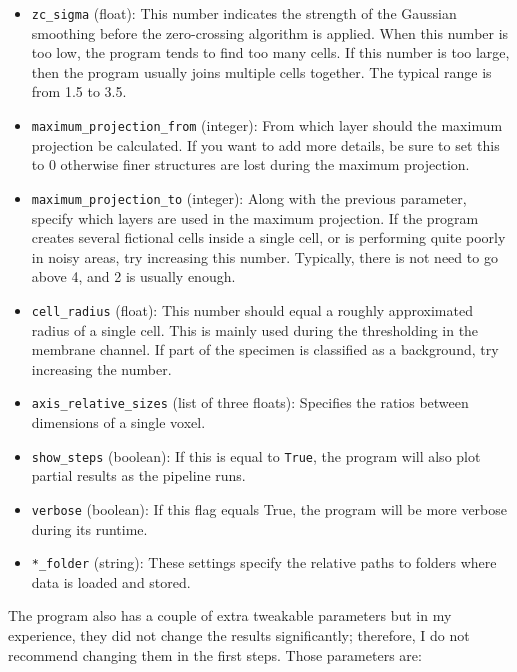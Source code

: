 \documentclass[
  digital,     %
  oneside,     %
  nosansbold,  %
  nocolorbold, %
  lof,         %
  lot,         %
]{fithesis4}
\begin{document}
\begin{itemize}
    \item \texttt{zc\_sigma} (float): This number indicates the strength of the
        Gaussian smoothing before the zero-crossing algorithm is applied. When this
        number is too low, the program tends to find too many cells. If this number is 
        too large, then the program usually joins multiple cells together. The typical
        range is from 1.5 to 3.5.
    \item \texttt{maximum\_projection\_from} (integer): From which layer should
        the maximum projection be calculated. If you want to add more details, be sure
        to set this to 0 otherwise finer structures are lost during the maximum
        projection.
    \item \texttt{maximum\_projection\_to} (integer): Along with the previous
        parameter, specify which layers are used in the maximum projection. If the
        program creates several fictional cells inside a single cell, or is performing
        quite poorly in noisy areas, try increasing this number. Typically, there
        is not need to go above 4, and 2 is usually enough.
    \item \texttt{cell\_radius} (float): This number should equal a roughly
        approximated radius of a single cell. This is mainly used during the
        thresholding in the membrane channel. If part of the specimen is
        classified as a background, try increasing the number.
    \item \texttt{axis\_relative\_sizes} (list of three floats): Specifies the
        ratios between dimensions of a single voxel.
    \item \texttt{show\_steps} (boolean): If this is equal to \texttt{True},
        the program will also plot partial results as the pipeline runs.
    \item \texttt{verbose} (boolean): If this flag equals True, the program
        will be more verbose during its runtime.
    \item \texttt{*\_folder} (string): These settings specify the relative paths
        to folders where data is loaded and stored.
\end{itemize}
The program also has a couple of extra tweakable parameters but in my experience,
they did not change the results significantly; therefore, I do not recommend
changing them in the first steps. Those parameters are:
\end{document}
